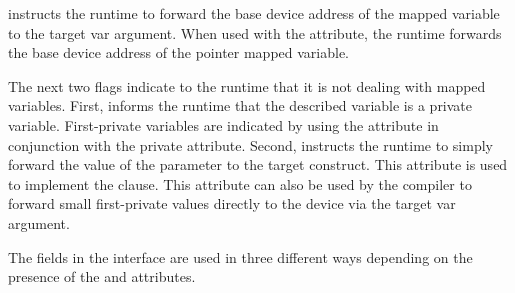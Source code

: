  instructs the runtime to forward the base device address of the mapped variable to the target var argument.  When used with  the  attribute, the runtime forwards the base device address of the pointer mapped variable. 

The next two flags indicate to the runtime that it is not dealing with mapped variables.  First,  informs the runtime that the described variable is a private variable. First-private variables are indicated by using the    attribute in conjunction with the private attribute. Second,  instructs the runtime to simply forward the value of the  parameter to the target construct.  This attribute is used to implement the  clause. This attribute can also be used by the compiler to forward small first-private values directly to the device via the target var argument. 

The fields in the interface are used in three different ways depending on the presence of the  and  attributes.


